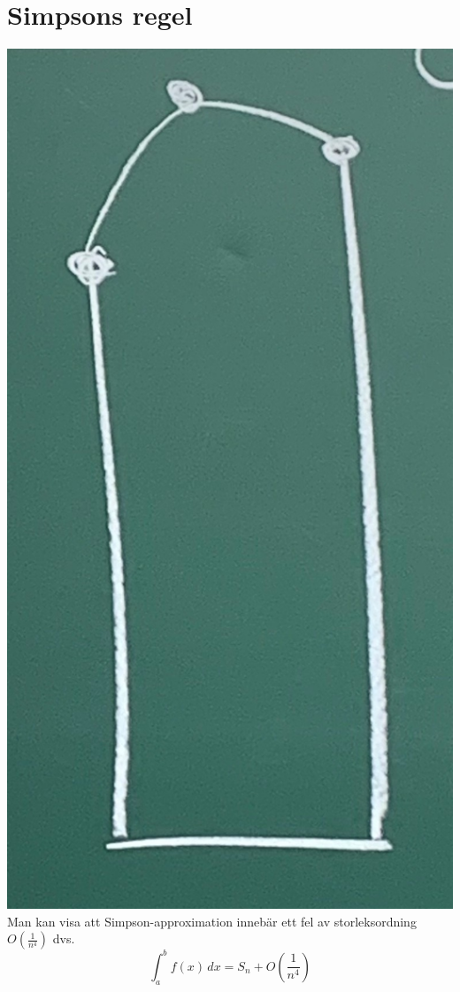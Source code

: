 \section{Simpsons regel}
\includegraphics[scale=0.1]{lessons/lesson18/imgs/img08.jpg}\\
Man kan visa att Simpson-approximation innebär ett fel av storleksordning $O(\frac{1}{n^4})$ dvs.
\begin{equation*}
    \int_a^b f(x)\, dx=S_n+O(\frac{1}{n^4})
\end{equation*}